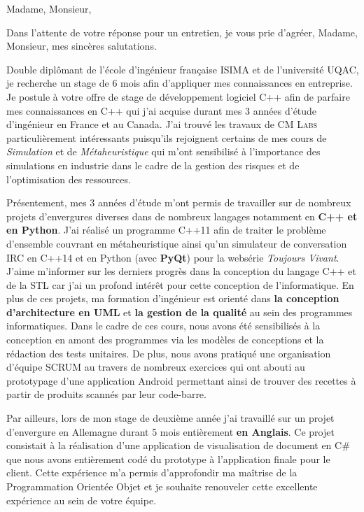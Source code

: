 \date{\today}
\opening{Madame, Monsieur,}
\closing{Dans l'attente de votre réponse pour un entretien, je vous prie d'agréer, Madame, Monsieur, mes sincères salutations.}

\makelettertitle

Double diplômant de l'école d'ingénieur française ISIMA et de l'université UQAC, je recherche un stage de 6 mois afin d’appliquer mes connaissances en entreprise. Je postule à votre offre de stage de développement logiciel C++ afin de parfaire mes connaissances en C++ qui j'ai acquise durant mes 3 années d'étude d'ingénieur en France et au Canada. J'ai trouvé les travaux de \textsc{CM Labs} particulièrement intéressants puisqu'ils rejoignent certains de mes cours de \textit{Simulation} et de \textit{Métaheuristique} qui m'ont sensibilisé à l'importance des simulations en industrie dans le cadre de la gestion des risques et de l'optimisation des ressources.

Présentement, mes 3 années d'étude m'ont permis de travailler sur de nombreux projets d'envergures diverses dans de nombreux langages notamment en \textbf{C++ et en Python}. J'ai réalisé un programme C++11 afin de traiter le problème d'ensemble couvrant en métaheuristique ainsi qu'un simulateur de conversation IRC en C++14 et en Python (avec \textbf{PyQt}) pour la websérie \textit{Toujours Vivant}. J'aime m'informer sur les derniers progrès dans la conception du langage C++ et de la STL car j'ai un profond intérêt pour cette conception de l'informatique. En plus de ces projets, ma formation d'ingénieur est orienté dans \textbf{la conception d'architecture en UML} et \textbf{la gestion de la qualité} au sein des programmes informatiques. Dans le cadre de ces cours, nous avons été sensibilisés à la conception en amont des programmes via les modèles de conceptions et la rédaction des tests unitaires. De plus, nous avons pratiqué une organisation d'équipe SCRUM au travers de nombreux exercices qui ont abouti au prototypage d'une application Android permettant ainsi de trouver des recettes à partir de produits scannés par leur code-barre.

Par ailleurs, lors de mon stage de deuxième année j'ai travaillé sur un projet d'envergure en Allemagne durant 5 mois entièrement \textbf{en Anglais}. Ce projet consistait à la réalisation d'une application de visualisation de document en C\# que nous avons entièrement codé du prototype à l'application finale pour le client. Cette expérience m'a permis d'approfondir ma maîtrise de la Programmation Orientée Objet et je souhaite renouveler cette excellente expérience au sein de votre équipe.

\makeletterclosing

